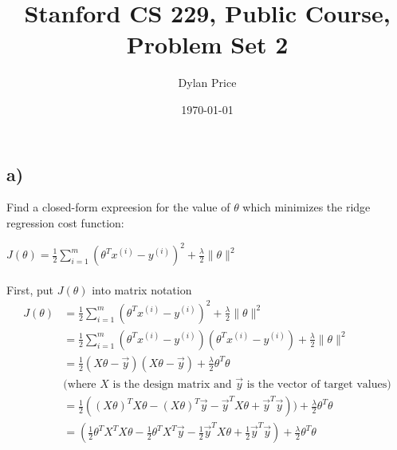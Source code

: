 \documentclass[11pt]{article}
\begin{document}
\title{Stanford CS 229, Public Course, Problem Set 2}
\date{\today}
\author{Dylan Price}
\maketitle 

\newcommand{\half}[0]{\frac{1}{2}}
\newcommand{\pder}[2]{\frac{\partial#1}{\partial#2}}
\newcommand{\thetaT}[0]{\theta^{T}}
\newcommand{\ith}[1]{#1^{(i)}}
\newcommand{\xith}[0]{\ith{x}}
\newcommand{\yith}[0]{\ith{y}}
\newcommand{\sumitom}[0]{\sum_{i=1}^{m}}
\newcommand{\xnew}[0]{x_{new}}

\section{}

\subsection*{a)}

Find a closed-form expreesion for the value of $\theta$ which minimizes the ridge regression cost function:

$J(\theta) = \half \sumitom (\thetaT \xith - \yith)^{2} + \frac{\lambda}{2}\|\theta\|^{2}$ \\ \\

First, put $J(\theta)$ into matrix notation
\begin{align*}
  J(\theta) &= \half \sumitom (\thetaT \xith - \yith)^{2} + \frac{\lambda}{2}\|\theta\|^{2} \\
            &= \half \sumitom (\thetaT \xith - \yith)(\thetaT \xith - \yith) + \frac{\lambda}{2}\|\theta\|^{2} \\
            &= \half (X \theta - \vec{y})(X \theta - \vec{y}) + \frac{\lambda}{2} \thetaT \theta \\
            & \text{(where $X$ is the design matrix and $\vec{y}$ is the vector of target values)} \\
            &= \half ((X \theta)^{T} X \theta - (X \theta)^{T} \vec{y} - \vec{y}^{T} X \theta + \vec{y}^{T} \vec{y})) + \frac{\lambda}{2} \thetaT \theta \\
            &= (\half \thetaT X^{T} X \theta - \half \thetaT X^{T} \vec{y} - \half \vec{y}^{T} X \theta + \half \vec{y}^{T} \vec{y}) + \frac{\lambda}{2} \thetaT \theta \\
\end{align*}
\end{document}
